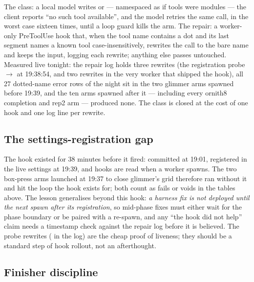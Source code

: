 The class: a local model writes  or  --- namespaced as if tools were modules ---
the client reports ``no such tool available'', and the model retries the same call, in the worst case sixteen
times, until a loop guard kills the arm. The repair: a worker-only PreToolUse hook that, when the tool name
contains a dot and its last segment names a known tool case-insensitively, rewrites the call to the bare name and
keeps the input, logging each rewrite; anything else passes untouched. Measured live tonight: the repair log
holds three rewrites (the registration probe  $\rightarrow$  at 19:38:54, and two
rewrites in the very worker that shipped the hook), all 27 dotted-name error rows of the night sit in the two
glimmer arms spawned before 19:39, and the ten arms spawned after it --- including every ornith8 completion
and rep2 arm --- produced none. The class is closed at the cost of one hook and one log line per rewrite.

\subsection{The settings-registration gap}\label{sec:gap}

The hook existed for 38 minutes before it fired: committed at 19:01, registered in the live settings at 19:39,
and hooks are read when a worker spawns. The two box-press arms launched at 19:37 to close glimmer's grid
therefore ran without it and hit the loop the hook exists for; both count as fails or voids in the tables above.
The lesson generalises beyond this hook: \emph{a harness fix is not deployed until the next spawn after its
registration}, so mid-phase fixes must either wait for the phase boundary or be paired with a re-spawn, and any
``the hook did not help'' claim needs a timestamp check against the repair log before it is believed. The probe
rewrites ( in the log) are the cheap proof of liveness; they should be a standard step of hook
rollout, not an afterthought.

\subsection{Finisher discipline}\label{sec:finisher}

